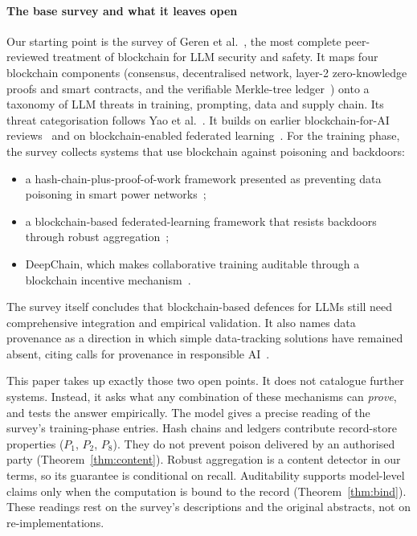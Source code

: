 \paragraph{The base survey and what it leaves open}
Our starting point is the survey of Geren et al.~\cite{geren2025blockchain}, the most
complete peer-reviewed treatment of blockchain for LLM security and safety. It maps four
blockchain components (consensus, decentralised network, layer-2 zero-knowledge proofs and
smart contracts, and the verifiable Merkle-tree ledger~\cite{merkle1988signature}) onto a
taxonomy of LLM threats in training, prompting, data and supply chain. Its threat
categorisation follows Yao et al.~\cite{yao2024llmsecurity}. It builds on earlier
blockchain-for-AI reviews~\cite{salah2019blockchain,dinh2018ai} and on blockchain-enabled
federated learning~\cite{qu2023bcfl}. For the training phase, the survey collects systems that
use blockchain against poisoning and backdoors:
\begin{itemize}
\item a hash-chain-plus-proof-of-work framework presented as preventing data poisoning in
  smart power networks~\cite{keshk2020privacy};
\item a blockchain-based federated-learning framework that resists backdoors through robust
  aggregation~\cite{li2023dbfl};
\item DeepChain, which makes collaborative training auditable through a blockchain incentive
  mechanism~\cite{weng2021deepchain}.
\end{itemize}
The survey itself concludes that blockchain-based defences for LLMs still need comprehensive
integration and empirical validation. It also names data provenance as a direction in which
simple data-tracking solutions have remained absent, citing calls for provenance in
responsible AI~\cite{werder2022provenance}.

This paper takes up exactly those two open points. It does not catalogue further systems.
Instead, it asks what any combination of these mechanisms can \emph{prove}, and tests the
answer empirically. The model gives a precise reading of the survey's training-phase entries.
Hash chains and ledgers contribute record-store properties ($P_1$, $P_2$, $P_8$). They do not
prevent poison delivered by an authorised party (Theorem~\ref{thm:content}). Robust
aggregation is a content detector in our terms, so its guarantee is conditional on recall.
Auditability supports model-level claims only when the computation is bound to the record
(Theorem~\ref{thm:bind}). These readings rest on the survey's descriptions and the original
abstracts, not on re-implementations.

